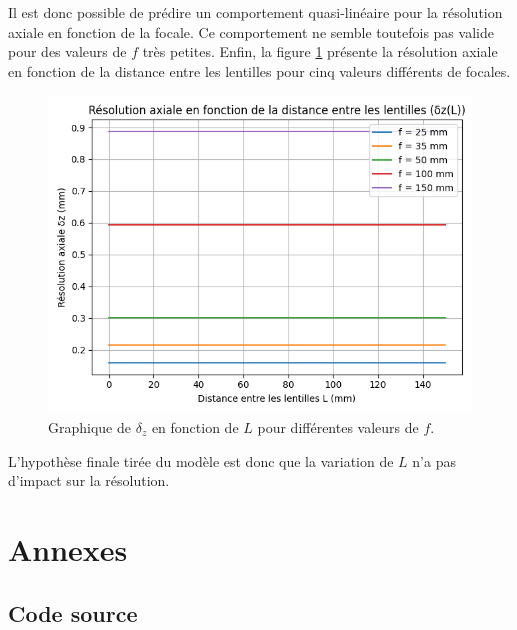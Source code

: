 \documentclass[11pt,letterpaper]{article}
\begin{document}
Il est donc possible de prédire un comportement quasi-linéaire pour la résolution axiale en fonction de la focale. Ce comportement ne semble toutefois pas valide pour des valeurs de $f$ très petites. Enfin, la figure \ref{resl} présente la résolution axiale en fonction de la distance entre les lentilles pour cinq valeurs différents de focales. 

\begin{figure}[H]
  \centering
  \includegraphics[scale=0.7]{res_vs_L.png}
  \caption{Graphique de $\delta_{z}$ en fonction de $L$ pour différentes valeurs de $f$.}
  \label{resl}
\end{figure}

L'hypothèse finale tirée du modèle est donc que la variation de $L$ n'a pas d'impact sur la résolution. 

\section{Annexes}

\subsection{Code source}
\end{document}
